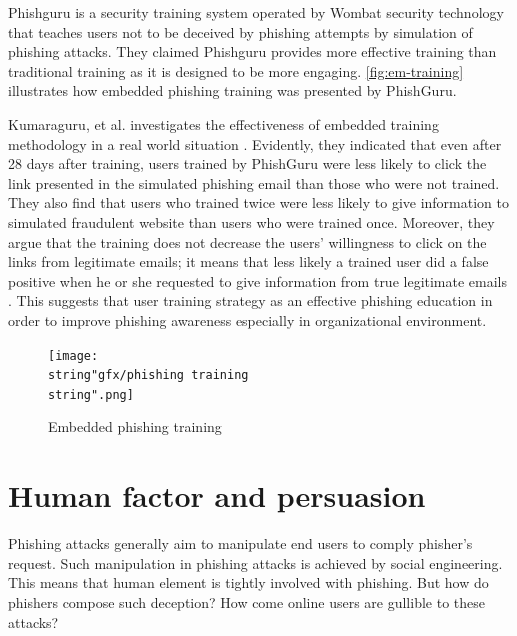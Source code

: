 Phishguru is a security training system operated by Wombat security
technology that teaches users not to be deceived by phishing attempts
by simulation of phishing attacks\citep{phishguru}. They claimed
Phishguru provides more effective training than traditional training
as it is designed to be more engaging. \autoref{fig:em-training}
illustrates how embedded phishing training was presented by PhishGuru.

Kumaraguru, et al. investigates the effectiveness of embedded training
methodology in a real world situation \citep{kumaraguru:2009}. Evidently,
they indicated that even after 28 days after training, users trained
by PhishGuru were less likely to click the link presented in the simulated
phishing email than those who were not trained. They also find that
users who trained twice were less likely to give information to simulated
fraudulent website than users who were trained once. Moreover, they
argue that the training does not decrease the users\textquoteright{}
willingness to click on the links from legitimate emails; it means
that less likely a trained user did a false positive when he or she
requested to give information from true legitimate emails \citep{kumaraguru:2009}.
This suggests that user training strategy as an effective phishing
education in order to improve phishing awareness especially in organizational
environment.

\begin{figure}
\begin{centering}
\texttt{[image: \\string"gfx/phishing training\\string".png]}\protect\caption{\label{fig:em-training}Embedded phishing training \citep{kumaraguru:2009}}

\par\end{centering}

\end{figure}



\section{\label{sec:Human-factor-and}Human factor and persuasion}

Phishing attacks generally aim to manipulate end users to comply phisher's
request. Such manipulation in phishing attacks is achieved by social
engineering. This means that human element is tightly involved with
phishing. But how do phishers compose such deception? How come online
users are gullible to these attacks? 

